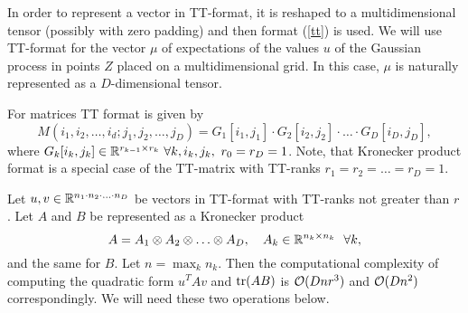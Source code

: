  In order to represent a vector in TT-format, it is reshaped to a multidimensional
  tensor (possibly with zero padding) and then format (\ref{tt}) is used. We will
  use TT-format for the vector $\mu$ of expectations of the values $u$ of the
  Gaussian process in points $Z$ placed on a multidimensional grid. In this case,
  $\mu$ is naturally represented as a $D$-dimensional tensor.

  For matrices TT format is given by
  \[
    M(i_1, i_2, \ldots, i_d; j_1, j_2, \ldots, j_D) = G_1 [i_1, j_1] \cdot
    G_2[i_2, j_2] \cdot \ldots \cdot G_D[i_D, j_D],
  \]
  where $G_k[i_k, j_k] \in \mathbb{R}^{r_{k-1}\times r_{k}}\ \forall k, i_k, j_k,\ r_0 = r_{D} = 1$.
  Note, that Kronecker product format is a special case of the TT-matrix with TT-ranks
  $r_1 = r_2 = \ldots = r_{D} = 1$.

  Let $u, v \in \mathbb{R}^{n_1 \cdot n_2 \cdot \ldots \cdot n_D}$ be vectors
  in TT-format with TT-ranks not greater than $r$. Let $A$ and $B$ be represented as a Kronecker product
  \[
    A = A_1 \otimes A_2 \otimes \ldots \otimes A_D,~~~A_k \in \mathbb{R}^{n_k \times n_k}~~\forall k,
  \]
  and the same for $B$. Let $n = \max_k n_k$. Then the computational complexity
  of computing the quadratic form $u^T A v$ and $\mbox{tr}(AB)$ is $\mathcal{O}(Dnr^3)$ and $\mathcal{O}(Dn^2)$ correspondingly. We will need these two
  operations below.
